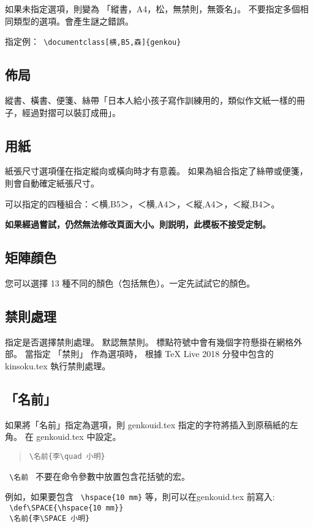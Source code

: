 \documentclass[a4,11pt,uplatex,openleft]{jsarticle}
\begin{document}
\par 如果未指定選項，則變為 「縱書，A4，松，無禁則，無簽名」。
不要指定多個相同類型的選項。會產生謎之錯誤。

\par 指定例：\quad \verb+ \documentclass[横,B5,森]{genkou} +



\subsection{佈局}
\par 縱書、橫書、便箋、絲帶「日本人給小孩子寫作訓練用的，類似作文紙一樣的冊子，經過對摺可以裝訂成冊」。

\subsection{用紙}
\par 紙張尺寸選項僅在指定縱向或橫向時才有意義。
如果為組合指定了絲帶或便箋，則會自動確定紙張尺寸。
\par 可以指定的四種組合：＜横,B5＞，＜横,A4＞，＜縦,A4＞，＜縦,B4＞。
\par {\bf{如果經過嘗試，仍然無法修改頁面大小。則説明，此模板不接受定制。}}

\subsection{矩陣顔色}
\par 您可以選擇 13 種不同的顏色（包括無色）。一定先試試它的顏色。

\subsection{禁則處理}
\par 指定是否選擇禁則處理。 默認無禁則。
標點符號中會有幾個字符懸掛在網格外部。 當指定 「禁則」 作為選項時，
根據  \TeX \hspace{3pt} Live 2018  分發中包含的 kinsoku.tex 執行禁則處理。

\subsection{「名前」}
\par 如果將「名前」指定為選項，則 genkouid.tex 指定的字符將插入到原稿紙的左角。
在 genkouid.tex 中設定。

\begin{verse}
\verb+\名前{李\quad 小明}+
\end{verse}
\par  \verb+ \名前 + 不要在命令參數中放置包含花括號的宏。
\par 例如，如果要包含 \verb+ \hspace{10 mm}+ 等，則可以在genkouid.tex 前寫入:\\
\verb+ \def\SPACE{\hspace{10 mm}} +\\
\verb+ \名前{李\SPACE 小明}+
\end{document}
